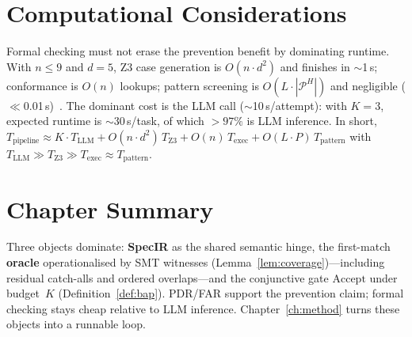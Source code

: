\section{Computational Considerations}
\label{sec:form:complexity}

Formal checking must not erase the prevention benefit by dominating runtime.
With $n\le 9$ and $d=5$, Z3 case generation is
$O(n\cdot d^2)$ and finishes in $\sim$1\,s; conformance is $O(n)$ lookups;
pattern screening is $O(L\cdot|\mathcal{P}^H|)$ and negligible
($\ll$0.01\,s)~\citep{demoura2008z3, barrett2018smt}.
The dominant cost is the LLM call ($\sim$10\,s/attempt): with $K=3$,
expected runtime is $\sim$30\,s/task, of which $>97\%$ is LLM inference.
In short,
$T_{\mathrm{pipeline}}\approx K\cdot T_{\mathrm{LLM}}+O(n\cdot d^2)\,T_{\mathrm{Z3}}
+O(n)\,T_{\mathrm{exec}}+O(L\cdot P)\,T_{\mathrm{pattern}}$
with $T_{\mathrm{LLM}}\gg T_{\mathrm{Z3}}\gg T_{\mathrm{exec}}\approx
T_{\mathrm{pattern}}$.

\section*{Chapter Summary}

Three objects dominate: \textbf{SpecIR} as the shared semantic hinge,
the first-match \textbf{oracle} operationalised by SMT witnesses
(Lemma~\ref{lem:coverage})---including residual catch-alls and ordered
overlaps---and the conjunctive gate $\mathrm{Accept}$ under budget~$K$
(Definition~\ref{def:bap}).
PDR/FAR support the prevention claim; formal checking stays cheap relative
to LLM inference.
Chapter~\ref{ch:method} turns these objects into a runnable loop.
